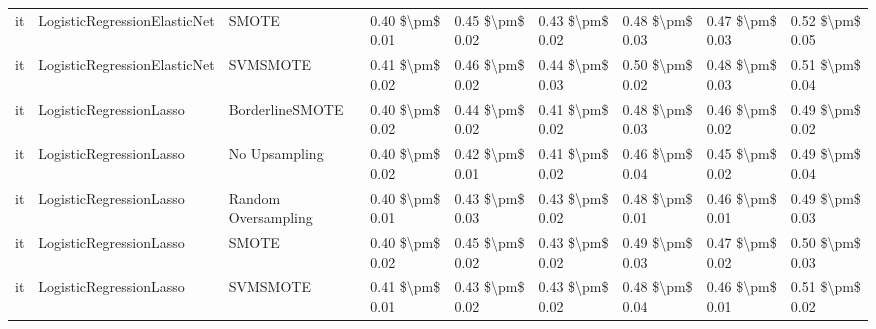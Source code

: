 \begin{tabular}{lllllllll}
      it &    LogisticRegressionElasticNet &                         SMOTE & 0.40 \$\textbackslash pm\$ 0.01 &           0.45 \$\textbackslash pm\$ 0.02 &       0.43 \$\textbackslash pm\$ 0.02 &        0.48 \$\textbackslash pm\$ 0.03 &                         0.47 \$\textbackslash pm\$ 0.03 &     0.52 \$\textbackslash pm\$ 0.05 \\
      it &    LogisticRegressionElasticNet &                      SVMSMOTE & 0.41 \$\textbackslash pm\$ 0.02 &           0.46 \$\textbackslash pm\$ 0.02 &       0.44 \$\textbackslash pm\$ 0.03 &        0.50 \$\textbackslash pm\$ 0.02 &                         0.48 \$\textbackslash pm\$ 0.03 &     0.51 \$\textbackslash pm\$ 0.04 \\
      it &         LogisticRegressionLasso &               BorderlineSMOTE & 0.40 \$\textbackslash pm\$ 0.02 &           0.44 \$\textbackslash pm\$ 0.02 &       0.41 \$\textbackslash pm\$ 0.02 &        0.48 \$\textbackslash pm\$ 0.03 &                         0.46 \$\textbackslash pm\$ 0.02 &     0.49 \$\textbackslash pm\$ 0.02 \\
      it &         LogisticRegressionLasso &                 No Upsampling & 0.40 \$\textbackslash pm\$ 0.02 &           0.42 \$\textbackslash pm\$ 0.01 &       0.41 \$\textbackslash pm\$ 0.02 &        0.46 \$\textbackslash pm\$ 0.04 &                         0.45 \$\textbackslash pm\$ 0.02 &     0.49 \$\textbackslash pm\$ 0.04 \\
      it &         LogisticRegressionLasso &           Random Oversampling & 0.40 \$\textbackslash pm\$ 0.01 &           0.43 \$\textbackslash pm\$ 0.03 &       0.43 \$\textbackslash pm\$ 0.02 &        0.48 \$\textbackslash pm\$ 0.01 &                         0.46 \$\textbackslash pm\$ 0.01 &     0.49 \$\textbackslash pm\$ 0.03 \\
      it &         LogisticRegressionLasso &                         SMOTE & 0.40 \$\textbackslash pm\$ 0.02 &           0.45 \$\textbackslash pm\$ 0.02 &       0.43 \$\textbackslash pm\$ 0.02 &        0.49 \$\textbackslash pm\$ 0.03 &                         0.47 \$\textbackslash pm\$ 0.02 &     0.50 \$\textbackslash pm\$ 0.03 \\
      it &         LogisticRegressionLasso &                      SVMSMOTE & 0.41 \$\textbackslash pm\$ 0.01 &           0.43 \$\textbackslash pm\$ 0.02 &       0.43 \$\textbackslash pm\$ 0.02 &        0.48 \$\textbackslash pm\$ 0.04 &                         0.46 \$\textbackslash pm\$ 0.01 &     0.51 \$\textbackslash pm\$ 0.02 \\

\end{tabular}
